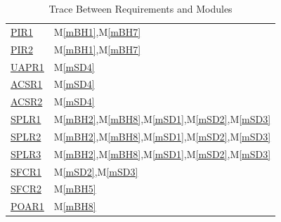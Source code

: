 \documentclass[12pt, titlepage]{article}
\newcommand{\mref}[1]{M\ref{#1}}
\begin{document}
\begin{table}[H]
\begin{tabular}{p{} p{}}
  \href{../../SRS/SRS.pdf#PIROne}{ PIR1 } & \mref{mBH1},\mref{mBH7}\\
  \href{../../SRS/SRS.pdf#PIRTwo}{ PIR2 } & \mref{mBH1},\mref{mBH7}\\
  \href{../../SRS/SRS.pdf#UAPROne}{ UAPR1 } & \mref{mSD4}\\
  \href{../../SRS/SRS.pdf#ACSROne}{ ACSR1 } & \mref{mSD4}\\
  \href{../../SRS/SRS.pdf#ACSRTwo}{ ACSR2 } & \mref{mSD4}\\
  \href{../../SRS/SRS.pdf#SPLROne}{ SPLR1 } & \mref{mBH2},\mref{mBH8},\mref{mSD1},\mref{mSD2},\mref{mSD3}\\
  \href{../../SRS/SRS.pdf#SPLRTwo}{ SPLR2 } & \mref{mBH2},\mref{mBH8},\mref{mSD1},\mref{mSD2},\mref{mSD3}\\
  \href{../../SRS/SRS.pdf#SPLRThree}{ SPLR3 } & \mref{mBH2},\mref{mBH8},\mref{mSD1},\mref{mSD2},\mref{mSD3}\\
  \href{../../SRS/SRS.pdf#SFCROne}{ SFCR1 } & \mref{mSD2},\mref{mSD3}\\
  \href{../../SRS/SRS.pdf#SFCRTwo}{ SFCR2 } & \mref{mBH5}\\
  \href{../../SRS/SRS.pdf#POAROne}{ POAR1 } & \mref{mBH8}\\
\bottomrule
\end{tabular}
\caption{Trace Between Requirements and Modules}
\end{table}

\newpage
\end{document}
